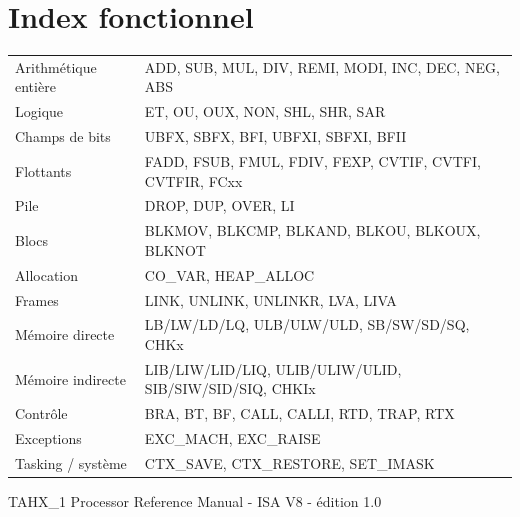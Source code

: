 \documentclass[10pt,a4paper,twoside,openany]{book}
\begin{document}
\clearpage
\chapter*{Index fonctionnel}
\begin{tabularx}{\linewidth}{@{}lX@{}}
Arithmétique entière & ADD, SUB, MUL, DIV, REMI, MODI, INC, DEC, NEG, ABS\\
Logique & ET, OU, OUX, NON, SHL, SHR, SAR\\
Champs de bits & UBFX, SBFX, BFI, UBFXI, SBFXI, BFII\\
Flottants & FADD, FSUB, FMUL, FDIV, FEXP, CVTIF, CVTFI, CVTFIR, FCxx\\
Pile & DROP, DUP, OVER, LI\\
Blocs & BLKMOV, BLKCMP, BLKAND, BLKOU, BLKOUX, BLKNOT\\
Allocation & CO\_VAR, HEAP\_ALLOC\\
Frames & LINK, UNLINK, UNLINKR, LVA, LIVA\\
Mémoire directe & LB/LW/LD/LQ, ULB/ULW/ULD, SB/SW/SD/SQ, CHKx\\
Mémoire indirecte & LIB/LIW/LID/LIQ, ULIB/ULIW/ULID, SIB/SIW/SID/SIQ, CHKIx\\
Contrôle & BRA, BT, BF, CALL, CALLI, RTD, TRAP, RTX\\
Exceptions & EXC\_MACH, EXC\_RAISE\\
Tasking / système & CTX\_SAVE, CTX\_RESTORE, SET\_IMASK\\
\end{tabularx}

\vfill
\begin{center}\small\color{TahxGray}
TAHX\_1 Processor Reference Manual - ISA V8 - édition 1.0
\end{center}
\end{document}
